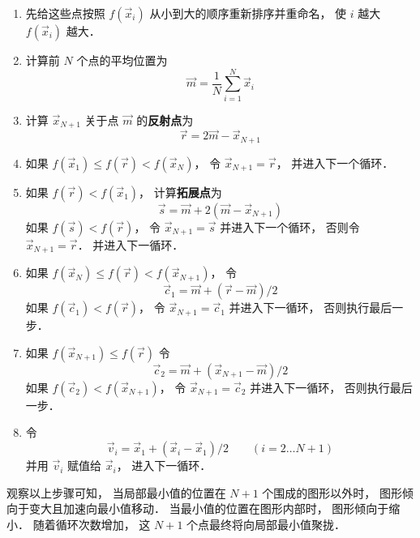 \begin{enumerate}
\item 先给这些点按照 $f(\vec x_i)$ 从小到大的顺序重新排序并重命名， 使 $i$ 越大 $f(\vec x_i)$ 越大．

\item 计算前 $N$ 个点的平均位置为
\begin{equation}
\vec m = \frac 1N \sum_{i=1}^N \vec x_i
\end{equation}

\item 计算 $\vec x_{N + 1}$ 关于点 $\vec m$ 的\textbf{反射点}为
\begin{equation}
\vec r = 2\vec m - \vec x_{N + 1}
\end{equation}

\item 如果 $f(\vec x_1) \le f(\vec r) < f(\vec x_N)$， 令 $\vec x_{N+1} = \vec r$， 并进入下一个循环．

\item 如果 $f(\vec r) < f(\vec x_1)$， 计算\textbf{拓展点}为
\begin{equation}
\vec s = \vec m + 2(\vec m - \vec x_{N+1})
\end{equation}
如果 $f(\vec s) < f(\vec r)$， 令 $\vec x_{N+1} = \vec s$ 并进入下一个循环， 否则令 $\vec x_{N+1} = \vec r$． 并进入下一循环．

\item 如果 $f(\vec x_N) \le f(\vec r) < f(\vec x_{N+1})$， 令
\begin{equation}
\vec c_1 = \vec m + (\vec r - \vec m)/2
\end{equation}
如果 $f(\vec c_1) < f(\vec r)$， 令 $\vec x_{N + 1} = \vec c_1$ 并进入下一循环， 否则执行最后一步．

\item 如果 $f(\vec x_{N+1}) \le f(\vec r)$ 令
\begin{equation}
\vec c_2 = \vec m + (\vec x_{N+1} - \vec m)/2
\end{equation}
如果 $f(\vec c_2) < f(\vec x_{N+1})$， 令 $\vec x_{N+1}  = \vec c_2$ 并进入下一循环， 否则执行最后一步．

\item 令
\begin{equation}
\vec v_i = \vec x_1 + (\vec x_i - \vec x_1)/2 \qquad (i = 2\dots N+1)
\end{equation}
并用 $\vec v_i$ 赋值给 $\vec x_i$， 进入下一循环．
\end{enumerate}

观察以上步骤可知， 当局部最小值的位置在 $N+1$ 个围成的图形以外时， 图形倾向于变大且加速向最小值移动． 当最小值的位置在图形内部时， 图形倾向于缩小． 随着循环次数增加， 这 $N+1$ 个点最终将向局部最小值聚拢． 

